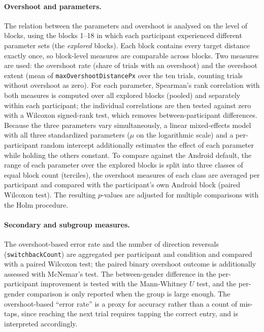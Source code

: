 \documentclass[12pt,a4paper]{report}
\begin{document}
        \paragraph{Overshoot and parameters.} The relation between the parameters and overshoot is analysed on the level of blocks, using the blocks 1--18 in which each participant experienced different parameter sets (the \emph{explored} blocks). Each block contains every target distance exactly once, so block-level measures are comparable across blocks. Two measures are used: the overshoot rate (share of trials with an overshoot) and the overshoot extent (mean of \texttt{maxOvershootDistancePx} over the ten trials, counting trials without overshoot as zero). For each parameter, Spearman's rank correlation with both measures is computed over all explored blocks (pooled) and separately within each participant; the individual correlations are then tested against zero with a Wilcoxon signed-rank test, which removes between-participant differences. Because the three parameters vary simultaneously, a linear mixed-effects model with all three standardized parameters ($\mu$ on the logarithmic scale) and a per-participant random intercept additionally estimates the effect of each parameter while holding the others constant. To compare against the Android default, the range of each parameter over the explored blocks is split into three classes of equal block count (terciles), the overshoot measures of each class are averaged per participant and compared with the participant's own Android block (paired Wilcoxon test). The resulting $p$-values are adjusted for multiple comparisons with the Holm procedure.

        \paragraph{Secondary and subgroup measures.} The overshoot-based error rate and the number of direction reversals (\texttt{switchbackCount}) are aggregated per participant and condition and compared with a paired Wilcoxon test; the paired binary overshoot outcome is additionally assessed with McNemar's test. The between-gender difference in the per-participant improvement is tested with the Mann-Whitney $U$ test, and the per-gender comparison is only reported when the group is large enough. The overshoot-based ``error rate'' is a proxy for accuracy rather than a count of mis-taps, since reaching the next trial requires tapping the correct entry, and is interpreted accordingly.
\end{document}
